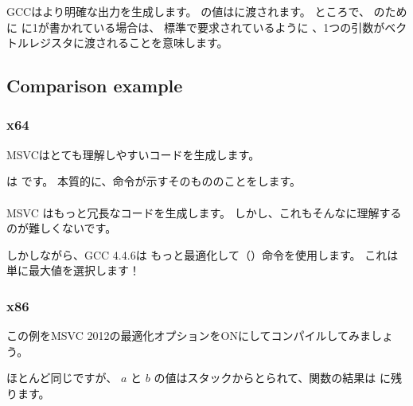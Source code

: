 GCCはより明確な出力を生成します。 
\printf の値はに渡されます。 
ところで、 \printf のために \EAX に1が書かれている場合は、
標準で要求されているように \SysVABI 、1つの引数がベクトルレジスタに渡されることを意味します。

\subsection{Comparison example}



\subsubsection{x64}



\Optimizing MSVCはとても理解しやすいコードを生成します。

 は です。 本質的に、命令が示すそのもののことをします。\\
\\
\NonOptimizing MSVC はもっと冗長なコードを生成します。
しかし、これもそんなに理解するのが難しくないです。



しかしながら、GCC 4.4.6は
もっと最適化して（）命令を使用します。
これは単に最大値を選択します！



\clearpage
\subsubsection{x86}

この例をMSVC 2012の最適化オプションをONにしてコンパイルしてみましょう。



ほとんど同じですが、 $a$ と $b$ の値はスタックからとられて、関数の結果は
に残ります。

